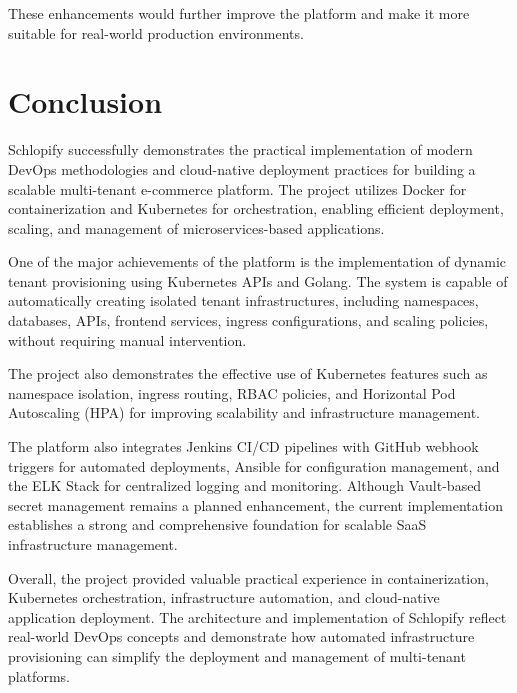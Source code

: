 \documentclass[12pt,a4paper]{report}
\begin{document}
These enhancements would further improve the platform and make it more suitable for real-world production environments.











\newpage

\chapter{Conclusion}

Schlopify successfully demonstrates the practical implementation of modern DevOps methodologies and cloud-native deployment practices for building a scalable multi-tenant e-commerce platform. The project utilizes Docker for containerization and Kubernetes for orchestration, enabling efficient deployment, scaling, and management of microservices-based applications.

One of the major achievements of the platform is the implementation of dynamic tenant provisioning using Kubernetes APIs and Golang. The system is capable of automatically creating isolated tenant infrastructures, including namespaces, databases, APIs, frontend services, ingress configurations, and scaling policies, without requiring manual intervention.

The project also demonstrates the effective use of Kubernetes features such as namespace isolation, ingress routing, RBAC policies, and Horizontal Pod Autoscaling (HPA) for improving scalability and infrastructure management.

The platform also integrates Jenkins CI/CD pipelines with GitHub webhook triggers for automated deployments, Ansible for configuration management, and the ELK Stack for centralized logging and monitoring. Although Vault-based secret management remains a planned enhancement, the current implementation establishes a strong and comprehensive foundation for scalable SaaS infrastructure management.

Overall, the project provided valuable practical experience in containerization, Kubernetes orchestration, infrastructure automation, and cloud-native application deployment. The architecture and implementation of Schlopify reflect real-world DevOps concepts and demonstrate how automated infrastructure provisioning can simplify the deployment and management of multi-tenant platforms.
\end{document}
